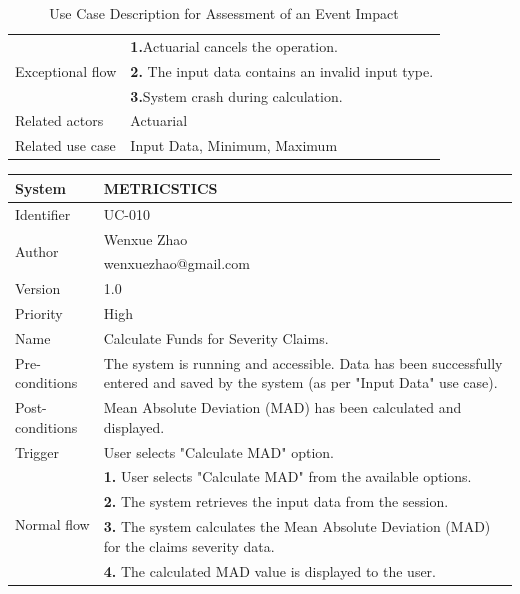 \begin{table}[htb]
\begin{tabular}{|p{4cm}|p{12cm}|}
         
        
        \hline
       \multirow{3}{*}{Exceptional flow} 
        & \textbf{1.}Actuarial cancels the operation. \\ 
        & \textbf{2.} The input data contains an invalid input type.   \\ 
         & \textbf{3.}System crash during calculation. \\ \hline  
        Related actors & Actuarial \\ \hline
        Related use case & Input Data, Minimum, Maximum  \\ \hline
    \end{tabular}
    \caption{Use Case Description for Assessment of an Event Impact}
    \label{tab:my_label}
\end{table}
\begin{table}[htb]
    \centering
     \begin{tabular}{|p{4cm}|p{12cm}|} \hline 
         System &  METRICSTICS\\ \hline 
         
         Identifier & UC-010 \\ \hline 
         
         \multirow{2}{*}{Author} & Wenxue Zhao   \\
         &wenxuezhao@gmail.com \\
           \hline 
           Version & 1.0\\ \hline
         
         Priority &  High\\ \hline 
         
         Name & Calculate Funds for Severity Claims. \\ \hline 
         Pre-conditions & The system is running and accessible.
Data has been successfully entered and saved by the system (as per "Input Data" use case).
 \\ \hline 
         Post-conditions & Mean Absolute Deviation (MAD) has been calculated and displayed. \\ \hline
         Trigger & User selects "Calculate MAD" option. \\ \hline
        \multirow{4}{*}{Normal flow} 
        & \textbf{1.} User selects "Calculate MAD" from the available options. \\ 
        & \textbf{2.} The system retrieves the input data from the session.   \\ 
 & \textbf{3.}  The system calculates the Mean Absolute Deviation (MAD) for the claims severity data. \\ 
 & \textbf{4.} The calculated MAD value is displayed to the user. \\ 
        

\end{tabular}
\end{table}
